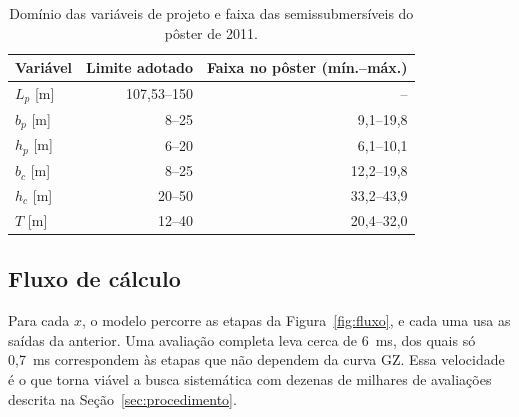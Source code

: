 \documentclass[11pt,a4paper]{article}
\begin{document}
\begin{table}[!htb]
\centering
\caption[Domínio das variáveis de projeto]{Domínio das variáveis de projeto e faixa das
semissubmersíveis do pôster de 2011.}\label{tab:limites}
\begin{tabular}{lrr}
\toprule
Variável & Limite adotado & Faixa no pôster (mín.--máx.) \\
\midrule
$L_p$ [m] & 107,53--150 & -- \\
$b_p$ [m] & 8--25 & 9,1--19,8 \\
$h_p$ [m] & 6--20 & 6,1--10,1 \\
$b_c$ [m] & 8--25 & 12,2--19,8 \\
$h_c$ [m] & 20--50 & 33,2--43,9 \\
$T$ [m] & 12--40 & 20,4--32,0 \\
\bottomrule
\end{tabular}
\end{table}

\subsection{Fluxo de cálculo}

Para cada $x$, o modelo percorre as etapas da Figura~\ref{fig:fluxo}, e cada uma usa as saídas da
anterior. Uma avaliação completa leva cerca de 6~ms, dos quais só 0,7~ms correspondem às etapas
que não dependem da curva GZ. Essa velocidade é o que torna viável a busca sistemática com dezenas
de milhares de avaliações descrita na Seção~\ref{sec:procedimento}.
\end{document}
